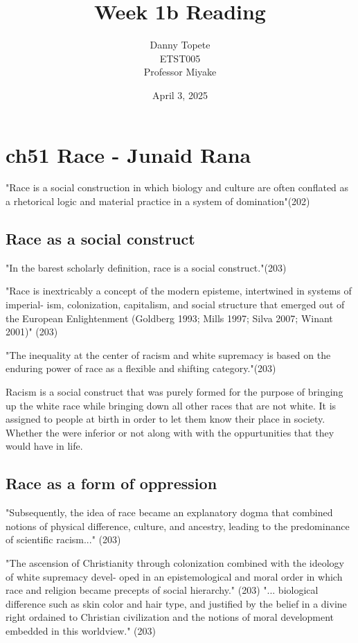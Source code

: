 \documentclass{article}
\title{Week 1b Reading}
\author{Danny Topete\\ ETST005 \\ Professor Miyake}
\date{April 3, 2025}
\begin{document}
\maketitle

\section{ch51 Race - Junaid Rana}
"Race is a social construction in which biology
and culture are often conflated as a rhetorical logic and
material practice in a system of domination"(202)

\subsection{Race as a social construct}

"In the barest scholarly definition, race is a social
construct."(203)

"Race is inextricably a concept of the
modern episteme, intertwined in systems of imperial-
ism, colonization, capitalism, and social structure that
emerged out of the European Enlightenment (Goldberg
1993; Mills 1997; Silva 2007; Winant 2001)" (203)

"The inequality at the center of racism and white
supremacy is based on the enduring power of race as a
flexible and shifting category."(203)

Racism is a social construct that was purely formed for the purpose
of bringing up the white race while bringing down all other
races that are not white. It is assigned to people
at birth in order to let them know their place in society.
Whether the were inferior or not along with
with the oppurtunities that they would have in life.

\subsection{Race as a form of oppression}

"Subsequently, the idea of race
became an explanatory dogma that combined notions
of physical difference, culture, and ancestry, leading to
the predominance of scientific racism..." (203)

"The ascension of Christianity through colonization
combined with the ideology of white supremacy devel-
oped in an epistemological and moral order in which
race and religion became precepts of social hierarchy." (203)
"... biological difference such as skin color and hair type, and justified
by the belief in a divine right ordained to Christian civilization 
and the notions of moral development embedded 
in this worldview." (203)
\end{document}
